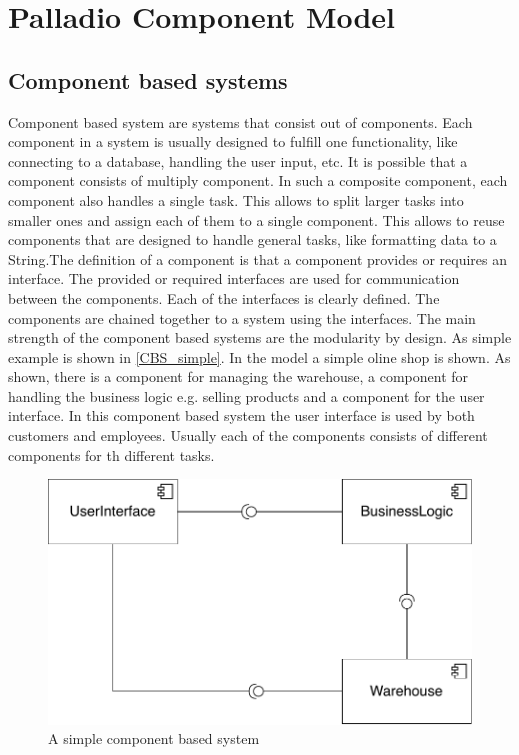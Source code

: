 \section{Palladio Component Model}
\label{sec:PCMIntro}
\subsection{Component based systems}
Component based system are systems that consist out of components. Each component in a system is usually designed to fulfill one functionality, like connecting to a database, handling the user input, etc. It is possible that a component consists of multiply component. In such a composite component, each component also handles a single task. This allows to split larger tasks into smaller ones and assign each of them to a single component. This allows to reuse components that are designed to handle general tasks, like formatting data to a String.The definition of a component is that a component provides or requires an interface. The provided or required interfaces are used for communication between the components. Each of the interfaces is clearly defined. The components are chained together to a system using the interfaces. The main strength of the component based systems are the modularity by design. As simple example is shown in \autoref{CBS_simple}. In the model a simple oline shop is shown. As shown, there is a component for managing the warehouse, a component for handling the business logic e.g. selling products and a component for the user interface. In this component based system the  user interface is used by both customers and employees. Usually each of the components consists of different components for th different tasks. 
\begin{figure}
\includegraphics[scale=.8]{logos/SimpleCBS.pdf}
\caption{A simple component based system}
\label{CBS_simple}
\end{figure}
